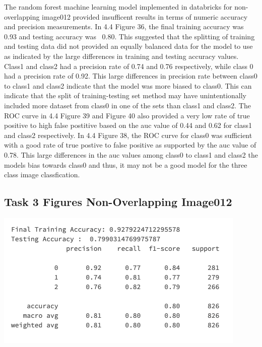 \documentclass[12pt]{article}
\begin{document}
\begin{multicols*}{2}
  \hspace*{5mm} The random forest machine learning model implemented in databricks for non-overlapping image012 provided insufficent results in terms of numeric
  accuracy and precision measurements. In 4.4 Figure 36, the final training accuracy was 0.93 and testing accuracy was ~0.80. This suggested that the splitting of training and testing data did not provided an equally
  balanced data for the model to use as indicated by the large differences in training and testing accuracy values. Class1 and class2 had a precision rate of 0.74 and 0.76 respectively, while class 0 had a precision rate
  of 0.92. This large differences in precision rate between class0 to class1 and class2 indicate that the model was more biased to class0. This can indicate that the split of training-testing set method may have unintentionally 
  included more dataset from class0 in one of the sets than class1 and class2. The ROC curve in 4.4 Figure 39 and Figure 40 also provided a very low rate of true positive to high false postitive based on the auc value of 0.44 and 0.62
  for class1 and class2 respectively. In 4.4 Figure 38, the ROC curve for class0 was sufficient with a good rate of true postive to false positive as supported by the auc value of 0.78.  
  This large differences in the auc values among class0 to class1 and class2 the models bias towards class0 and thus, it may not be a good model for the three class image classfication. 

  \subsection{Task 3 Figures Non-Overlapping Image012}
  \begin{center}
	\includegraphics[scale=0.4]{../screenshot/Non-Overlapping/score012.png}


\end{center}
\end{multicols*}
\end{document}
